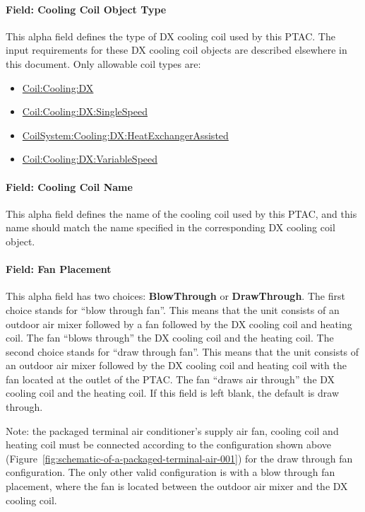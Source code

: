\paragraph{Field: Cooling Coil Object Type}\label{field-cooling-coil-object-type-3-000}

This alpha field defines the type of DX cooling coil used by this PTAC. The input requirements for these DX cooling coil objects are described elsewhere in this document. Only allowable coil types are:

\begin{itemize}
\item
  \hyperref[coilcoolingdx]{Coil:Cooling:DX}
\item
  \hyperref[coilcoolingdxsinglespeed]{Coil:Cooling:DX:SingleSpeed}
\item
  \hyperref[coilsystemcoolingdxheatexchangerassisted]{CoilSystem:Cooling:DX:HeatExchangerAssisted}
\item
  \hyperref[coilcoolingdxvariablespeed]{Coil:Cooling:DX:VariableSpeed}
\end{itemize}

\paragraph{Field: Cooling Coil Name}\label{field-cooling-coil-name-2-001}

This alpha field defines the name of the cooling coil used by this PTAC, and this name should match the name specified in the corresponding DX cooling coil object.

\paragraph{Field: Fan Placement}\label{field-fan-placement-3-000}

This alpha field has two choices: \textbf{BlowThrough} or \textbf{DrawThrough}. The first choice stands for ``blow through fan''. This means that the unit consists of an outdoor air mixer followed by a fan followed by the DX cooling coil and heating coil. The fan ``blows through'' the DX cooling coil and the heating coil. The second choice stands for ``draw through fan''. This means that the unit consists of an outdoor air mixer followed by the DX cooling coil and heating coil with the fan located at the outlet of the PTAC. The fan ``draws air through'' the DX cooling coil and the heating coil. If this field is left blank, the default is draw through.

Note: the packaged terminal air conditioner's supply air fan, cooling coil and heating coil must be connected according to the configuration shown above (Figure~\ref{fig:schematic-of-a-packaged-terminal-air-001}) for the draw through fan configuration. The only other valid configuration is with a blow through fan placement, where the fan is located between the outdoor air mixer and the DX cooling coil.

